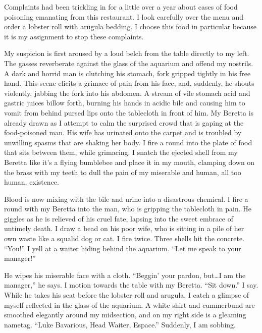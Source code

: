 Complaints had been trickling in for a little over a year about
cases of food poisoning emanating from this restaurant. I look
carefully over the menu and order a lobster roll with arugula
bedding. I choose this food in particular because it is my
assignment to stop these complaints.



My suspicion is first aroused by a loud belch from the table
directly to my left. The gasses reverberate against the glass of
the aquarium and offend my nostrils. A dark and horrid man is
clutching his stomach, fork gripped tightly in his free hand. This
scene elicits a grimace of pain from his face, and, suddenly, he
shouts violently, jabbing the fork into his abdomen. A stream of
vile stomach acid and gastric juices billow forth, burning his
hands in acidic bile and causing him to vomit from behind pursed
lips onto the tablecloth in front of him. My Beretta is already
drawn as I attempt to calm the surprised crowd that is gaping at
the food-poisoned man. His wife has urinated onto the carpet and is
troubled by unwilling spasms that are shaking her body. I fire a
round into the plate of food that sits between them, while
grimacing. I snatch the ejected shell from my Beretta like
it's a flying bumblebee and place it in my mouth, clamping
down on the brass with my teeth to dull the pain of my miserable
and human, all too human, existence.



Blood is now mixing with the bile and urine into a disastrous
chemical. I fire a round with my Beretta into the man, who is
gripping the tablecloth in pain. He giggles as he is relieved of
his cruel fate, lapsing into the sweet embrace of untimely death. I
draw a bead on his poor wife, who is sitting in a pile of her own
waste like a squalid dog or cat. I fire twice. Three shells hit the
concrete. ``You!'' I yell at a waiter hiding behind the
aquarium. ``Let me speak to your manager!''



He wipes his miserable face with a cloth. ``Beggin' your
pardon, but{\ldots}I am the manager,'' he says. I motion
towards the table with my Beretta. ``Sit down.'' I say.
While he takes his seat before the lobster roll and arugula, I
catch a glimpse of myself reflected in the glass of the aquarium. A
white shirt and cummerbund are smoothed elegantly around my
midsection, and on my right side is a gleaming nametag. ``Luke
Bavarious, Head Waiter, Espace.'' Suddenly, I am sobbing. 

